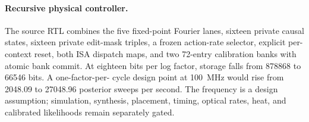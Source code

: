 \paragraph{Recursive physical controller.}
The source RTL combines the five fixed-point Fourier lanes, sixteen private causal states,
sixteen private edit-mask triples, a frozen action-rate selector, explicit per-context
reset, both ISA dispatch maps, and two 72-entry calibration banks with atomic bank commit.
At eighteen bits per log factor, storage falls from 878868 to 66546 bits.  A one-factor-per-
cycle design point at 100~MHz would rise from 2048.09 to 27048.96 posterior sweeps per
second.  The frequency is a design assumption; simulation, synthesis, placement, timing,
optical rates, heat, and calibrated likelihoods remain separately gated.
